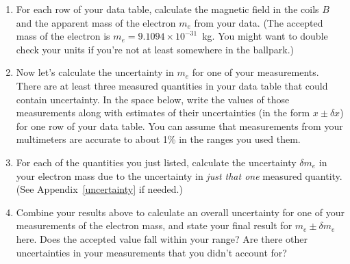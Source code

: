 \begin{enumerate}[labparts]

\item For each row of your data table, calculate the magnetic field in the coils $B$ and the apparent mass of the electron $m_e$ from your data.  (The accepted mass of the electron is $m_e = 9.1094 \times 10^{-31}$~kg.  You might want to double check your units if you're not at least somewhere in the ballpark.)
\answerspace{1.5in}

\item Now let's calculate the uncertainty in $m_e$ for one of your measurements.  There are at least three measured quantities in your data table that could contain uncertainty.  In the space below, write the values of those measurements along with estimates of their uncertainties (in the form $x \pm \delta x$) for one row of your data table.  You can assume that measurements from your multimeters are accurate to about 1\% in the ranges you used them.
\answerspace{1.5in}

\item For each of the quantities you just listed, calculate the uncertainty $\delta m_e$ in your electron mass due to the uncertainty in \textit{just that one} measured quantity.  (See Appendix~\ref{uncertainty} if needed.)
\answerspace{1.5in}

\item Combine your results above to calculate an overall uncertainty for one of your measurements of the electron mass, and state your final result for $m_e \pm \delta m_e$ here.   Does the accepted value fall within your range?  Are there other uncertainties in your measurements that you didn't account for? 
\answerspace{0.5in}

\end{enumerate}



